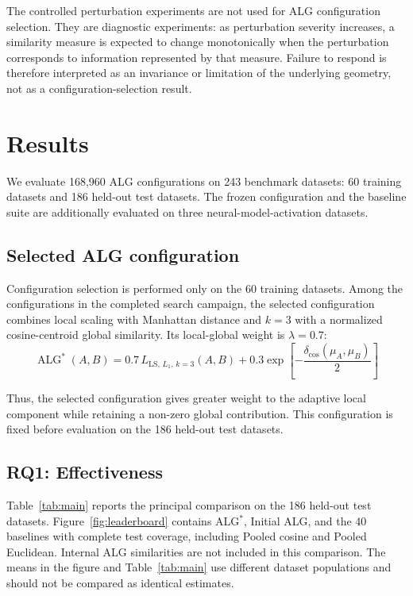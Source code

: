 \documentclass[preprint,12pt]{elsarticle}
\newcommand{\ALG}{\operatorname{ALG}}
\newcommand{\deltacos}{\delta_{\mathrm{cos}}}
\begin{document}
The controlled perturbation experiments are not used for ALG configuration
selection. They are diagnostic experiments: as perturbation severity increases,
a similarity measure is expected to change monotonically when the perturbation
corresponds to information represented by that measure. Failure to respond is
therefore interpreted as an invariance or limitation of the underlying
geometry, not as a configuration-selection result.

\section{Results}
\label{sec:results}

We evaluate 168,960 ALG configurations on 243 benchmark datasets: 60 training
datasets and 186 held-out test datasets. The frozen configuration and the
baseline suite are additionally evaluated on three neural-model-activation
datasets.

\subsection{Selected ALG configuration}

Configuration selection is performed only on the 60 training datasets.
Among the configurations in the completed search campaign, the selected
configuration combines local scaling with Manhattan distance and $k=3$ with a
normalized cosine-centroid global similarity. Its local-global weight is
$\lambda=0.7$:
\begin{equation}
\boxed{
\ALG^*(A,B)=
0.7\,L_{\mathrm{LS},\,L_1,\,k=3}(A,B)
+
0.3\exp\!\left[
-\frac{\deltacos(\mu_A,\mu_B)}{2}
\right]
}
\label{eq:selected-alg}
\end{equation}

Thus, the selected configuration gives greater weight to the adaptive local
component while retaining a non-zero global contribution. This configuration
is fixed before evaluation on the 186 held-out test datasets.

\subsection{RQ1: Effectiveness}

Table~\ref{tab:main} reports the principal comparison on the 186 held-out
test datasets. Figure~\ref{fig:leaderboard} contains ALG$^*$,
Initial ALG, and the 40 baselines with complete test coverage, including
Pooled cosine and Pooled Euclidean. Internal ALG similarities are not included
in this comparison. The means in the figure and Table~\ref{tab:main} use
different dataset populations and should not be compared as identical estimates.
\end{document}
